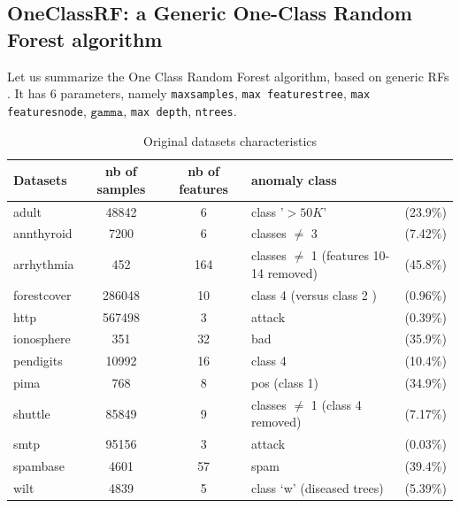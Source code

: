 \subsection{OneClassRF: a Generic One-Class Random Forest algorithm}
Let us summarize the One Class Random Forest algorithm, based on generic
\acp{RF} \citep{Breiman2001}. It has $6$ parameters, namely
\texttt{max\textunderscore samples}, \texttt{max\textunderscore
features\textunderscore tree}, \texttt{max\textunderscore
features\textunderscore node}, $\texttt{gamma}$, \texttt{max\textunderscore
depth}, \texttt{n\textunderscore trees}.
%
\begin{table}[ht]
    \caption{Original datasets characteristics}
    \label{ocrf:table:data}
    \centering
    \footnotesize
    \begin{tabularx}{\textwidth}{lccXl}
        \toprule
        Datasets        & nb of samples      & nb of features     &
       anomaly class      &                   \\
        \midrule
        adult       & 48842              & 6                  &    class
        '$>50K$' &      (23.9\%)      \\
        annthyroid  & 7200               & 6                  &    classes
        $\neq$ 3 &        (7.42\%)    \\
        arrhythmia  & 452                & 164                &    classes
        $\neq$ 1 (features 10-14 removed)&  (45.8\%)          \\
        forestcover & 286048             & 10                 &    class 4
        (versus  class 2 )                  &           (0.96\%) \\
        http        & 567498             & 3                  &      attack &
        (0.39\%)        \\
        ionosphere  & 351                & 32                 &    bad &
        (35.9\%)     \\
        pendigits   & 10992              & 16                 &    class 4 &
        (10.4\%)    \\
        pima        & 768                & 8                  &    pos (class
        1) &        (34.9\%)    \\
        shuttle     & 85849              & 9                  &      classes
        $\neq$ 1 (class 4 removed)     &  (7.17\%)          \\
        smtp        & 95156              & 3                  &      attack &
        (0.03\%)        \\
        spambase    & 4601               & 57                 &    spam &
        (39.4\%) \\
        wilt        & 4839               & 5                  &    class `w'
        (diseased trees)               &    (5.39\%)        \\
        \bottomrule
    \end{tabularx}
\end{table}

